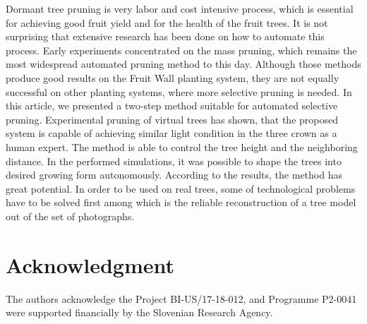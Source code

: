 \documentclass[1p]{elsarticle}
\begin{document}
Dormant tree pruning is very labor and cost intensive process, which is
essential for achieving good fruit yield and for the health of the fruit
trees. It is not surprising that extensive research has been done on how
to automate this process. Early experiments concentrated on the mass
pruning, which remains the most widespread automated pruning method to
this day. Although those methods produce good results on the Fruit Wall
planting system, they are not equally successful on other planting
systems, where more selective pruning is needed. In this article, we
presented a two-step method suitable for automated selective pruning.
Experimental pruning of virtual trees has shown, that the proposed
system is capable of achieving similar light condition in the three
crown as a human expert. The method is able to control the tree height
and the neighboring distance. In the performed simulations, it was
possible to shape the trees into desired growing form autonomously.
According to the results, the method has great potential. In order to be
used on real trees, some of technological problems have to be solved
first among which is the reliable reconstruction of a tree model out of
the set of photographs.

\section*{Acknowledgment}

The authors acknowledge the Project BI-US/17-18-012, and Programme
P2-0041 were supported financially by the Slovenian Research Agency.


\end{document}
